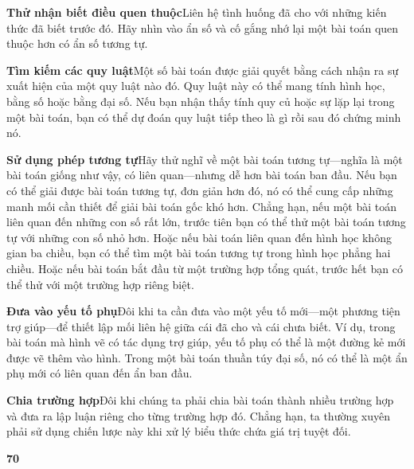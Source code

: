 \documentclass[10pt,letterpaper]{article}
\begin{document}
\begin{minipage}[t]{0.72\textwidth}
    \vspace{0.2cm}
    \textbf{\textsf{\textcolor{stewartblue}{Thử nhận biết điều quen thuộc}}}\quad Liên hệ tình huống đã cho với những kiến thức đã biết trước đó. Hãy nhìn vào ẩn số và cố gắng nhớ lại một bài toán quen thuộc hơn có ẩn số tương tự.

    \vspace{0.18cm}
    \textbf{\textsf{\textcolor{stewartblue}{Tìm kiếm các quy luật}}}\quad Một số bài toán được giải quyết bằng cách nhận ra sự xuất hiện của một quy luật nào đó. Quy luật này có thể mang tính hình học, bằng số hoặc bằng đại số. Nếu bạn nhận thấy tính quy củ hoặc sự lặp lại trong một bài toán, bạn có thể dự đoán quy luật tiếp theo là gì rồi sau đó chứng minh nó.

    \vspace{0.18cm}
    \textbf{\textsf{\textcolor{stewartblue}{Sử dụng phép tương tự}}}\quad Hãy thử nghĩ về một bài toán tương tự—nghĩa là một bài toán giống như vậy, có liên quan—nhưng dễ hơn bài toán ban đầu. Nếu bạn có thể giải được bài toán tương tự, đơn giản hơn đó, nó có thể cung cấp những manh mối cần thiết để giải bài toán gốc khó hơn. Chẳng hạn, nếu một bài toán liên quan đến những con số rất lớn, trước tiên bạn có thể thử một bài toán tương tự với những con số nhỏ hơn. Hoặc nếu bài toán liên quan đến hình học không gian ba chiều, bạn có thể tìm một bài toán tương tự trong hình học phẳng hai chiều. Hoặc nếu bài toán bắt đầu từ một trường hợp tổng quát, trước hết bạn có thể thử với một trường hợp riêng biệt.

    \vspace{0.18cm}
    \textbf{\textsf{\textcolor{stewartblue}{Đưa vào yếu tố phụ}}}\quad Đôi khi ta cần đưa vào một yếu tố mới—một phương tiện trợ giúp—để thiết lập mối liên hệ giữa cái đã cho và cái chưa biết. Ví dụ, trong bài toán mà hình vẽ có tác dụng trợ giúp, yếu tố phụ có thể là một đường kẻ mới được vẽ thêm vào hình. Trong một bài toán thuần túy đại số, nó có thể là một ẩn phụ mới có liên quan đến ẩn ban đầu.

    \vspace{0.18cm}
    \textbf{\textsf{\textcolor{stewartblue}{Chia trường hợp}}}\quad Đôi khi chúng ta phải chia bài toán thành nhiều trường hợp và đưa ra lập luận riêng cho từng trường hợp đó. Chẳng hạn, ta thường xuyên phải sử dụng chiến lược này khi xử lý biểu thức chứa giá trị tuyệt đối.
\end{minipage}

\vfill
\noindent
\textbf{\textsf{70}}
\end{document}
